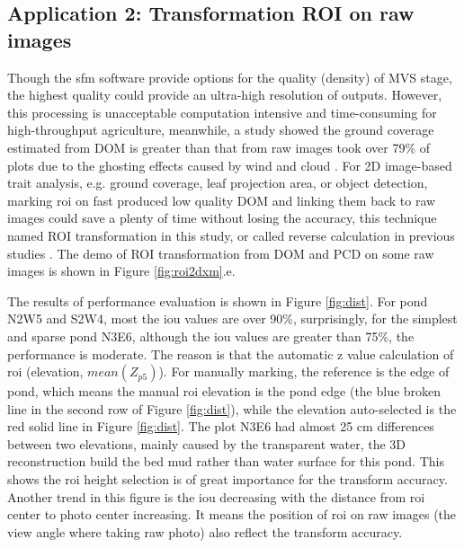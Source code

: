 \documentclass[doublespacing]{configs/bmcart}
\begin{document}
\subsection*{Application 2: Transformation ROI on raw images}
Though the \acrshort*{sfm} software provide options for the quality (density) of MVS stage, the highest quality could provide an ultra-high resolution of outputs. However, this processing is unacceptable computation intensive and time-consuming for high-throughput agriculture, meanwhile, a study showed the ground coverage estimated from DOM is greater than that from raw images took over 79\% of plots due to the ghosting effects caused by wind and cloud \cite{duan_comparison_2017}. For 2D image-based trait analysis, e.g. ground coverage, leaf projection area, or object detection, marking \acrshort*{roi} on fast produced low quality DOM and linking them back to raw images could save a plenty of time without losing the accuracy, this technique named ROI transformation in this study, or called reverse calculation in previous studies \cite{tresch_easympe_2019, duan_comparison_2017}. The demo of ROI transformation from DOM and PCD on some raw images is shown in Figure \ref{fig:roi2dxm}.e.

The results of performance evaluation is shown in Figure \ref{fig:dist}. For pond N2W5 and S2W4, most the \acrshort*{iou} values are over 90\%, surprisingly, for the simplest and sparse pond N3E6, although the \acrshort{iou} values are greater than 75\%, the performance is moderate. The reason is that the automatic z value calculation of \acrshort*{roi} (elevation, $mean(Z_{p5})$). For manually marking, the reference is the edge of pond, which means the manual \acrshort*{roi} elevation is the pond edge (the blue broken line in the second row of Figure \ref{fig:dist}), while the elevation auto-selected is the red solid line in Figure \ref{fig:dist}. The plot N3E6 had almost 25 cm differences between two elevations, mainly caused by the transparent water, the 3D reconstruction build the bed mud rather than water surface for this pond. This shows the \acrshort*{roi} height selection is of great importance for the transform accuracy. Another trend in this figure is the \acrshort*{iou} decreasing with the distance from \acrshort*{roi} center to photo center increasing. It means the position of \acrshort*{roi} on raw images (the view angle where taking raw photo) also reflect the transform accuracy. 
\end{document}
